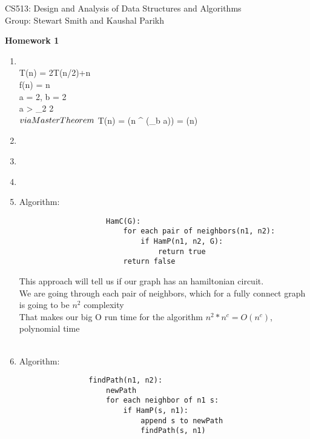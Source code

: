 \documentclass[11pt]{article}
\begin{document}

\noindent CS513: Design and Analysis of Data Structures and Algorithms \\
        Group: Stewart Smith and Kaushal Parikh\\

        \begin{center}
        \LARGE{\textbf{Homework 1}}\\
            \end{center}

            \vspace{.1in}


            \begin{enumerate}

            \item \\
                T(n) = 2T(n/2)+\log n \\
                f(n) = \log n \\
                a = 2, b = 2 \\
                a > \log _2 2 \\
                $ via Master Theorem \\$
                T(n) = \Theta(n ^ {(\log _b a)}) = \Theta(n)\\
            \item \\
            \item \\
            \item \\
            \item Algorithm:
                    \begin{verbatim}
                    HamC(G):
                        for each pair of neighbors(n1, n2):
                            if HamP(n1, n2, G):
                                return true
                        return false
                    \end{verbatim}

                    This approach will tell us if our graph has an hamiltonian circuit. \\
                    We are going through each pair of neighbors, which for a fully connect graph is going to be $n^2$ complexity\\
                    That makes our big O run time for the algorithm $n^2 * n^c = O(n^c)$, polynomial time\\
                    \\
            \item
               Algorithm:
               \begin{verbatim}
                findPath(n1, n2):
                    newPath
                    for each neighbor of n1 s:
                        if HamP(s, n1):
                            append s to newPath
                            findPath(s, n1)
               \end{verbatim}\\


\end{enumerate}
\end{document}
